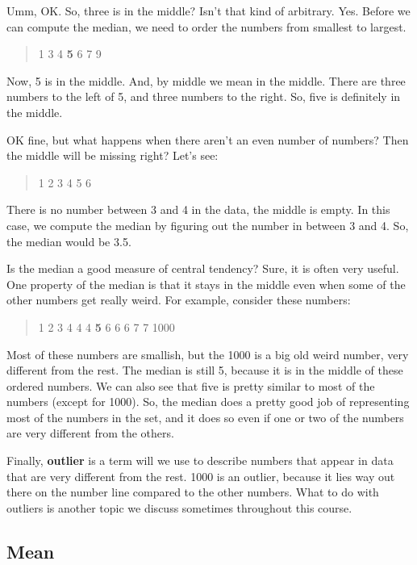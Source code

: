 \documentclass[
]{book}
\begin{document}
Umm, OK. So, three is in the middle? Isn't that kind of arbitrary. Yes. Before we can compute the median, we need to order the numbers from smallest to largest.

\begin{quote}
1 3 4 \textbf{5} 6 7 9
\end{quote}

Now, 5 is in the middle. And, by middle we mean in the middle. There are three numbers to the left of 5, and three numbers to the right. So, five is definitely in the middle.

OK fine, but what happens when there aren't an even number of numbers? Then the middle will be missing right? Let's see:

\begin{quote}
1 2 3 4 5 6
\end{quote}

There is no number between 3 and 4 in the data, the middle is empty. In this case, we compute the median by figuring out the number in between 3 and 4. So, the median would be 3.5.

Is the median a good measure of central tendency? Sure, it is often very useful. One property of the median is that it stays in the middle even when some of the other numbers get really weird. For example, consider these numbers:

\begin{quote}
1 2 3 4 4 4 \textbf{5} 6 6 6 7 7 1000
\end{quote}

Most of these numbers are smallish, but the 1000 is a big old weird number, very different from the rest. The median is still 5, because it is in the middle of these ordered numbers. We can also see that five is pretty similar to most of the numbers (except for 1000). So, the median does a pretty good job of representing most of the numbers in the set, and it does so even if one or two of the numbers are very different from the others.

Finally, \textbf{outlier} is a term will we use to describe numbers that appear in data that are very different from the rest. 1000 is an outlier, because it lies way out there on the number line compared to the other numbers. What to do with outliers is another topic we discuss sometimes throughout this course.

\hypertarget{mean}{%
\subsection{Mean}\label{mean}}
\end{document}
